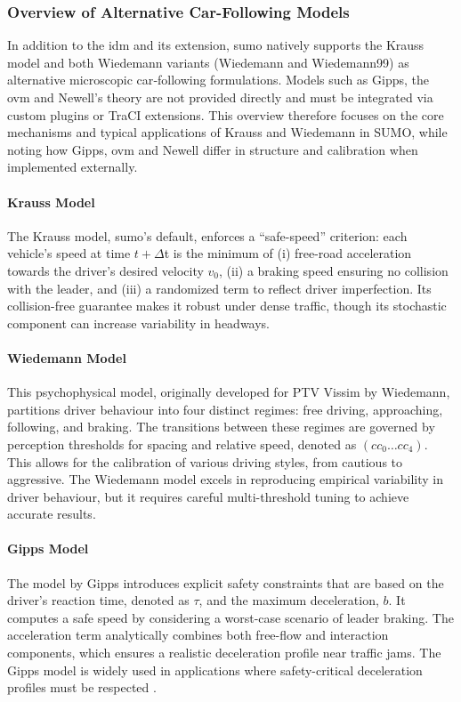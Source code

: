 \subsubsection{Overview of Alternative Car-Following Models}
\label{subsubsec:alternative_models}
In addition to the \ac{idm} and its extension, \ac{sumo} natively supports the Krauss model and both Wiedemann variants (Wiedemann and Wiedemann99) as alternative microscopic car‐following formulations. Models such as Gipps, the \acf{ovm} and Newell’s theory are not provided directly and must be integrated via custom plugins or TraCI extensions. This overview therefore focuses on the core mechanisms and typical applications of Krauss and Wiedemann in SUMO, while noting how Gipps, \ac{ovm} and Newell differ in structure and calibration when implemented externally.

\paragraph{Krauss Model}  
The Krauss model, \ac{sumo}’s default, enforces a \enquote{safe-speed} criterion: each vehicle’s speed at time $t+\Delta $t is the minimum of (i) free-road acceleration towards the driver’s desired velocity $v_0$, (ii) a braking speed ensuring no collision with the leader, and (iii) a randomized term to reflect driver imperfection. Its collision-free guarantee makes it robust under dense traffic, though its stochastic component can increase variability in headways. \cite{Krauss1997}

\paragraph{Wiedemann Model}
This psychophysical model, originally developed for PTV Vissim by Wiedemann, partitions driver behaviour into four distinct regimes: free driving, approaching, following, and braking. The transitions between these regimes are governed by perception thresholds for spacing and relative speed, denoted as $(cc_0\ldots cc_4)$. This allows for the calibration of various driving styles, from cautious to aggressive. The Wiedemann model excels in reproducing empirical variability in driver behaviour, but it requires careful multi-threshold tuning to achieve accurate results. \cite{Wiedemann1974}

\paragraph{Gipps Model}
The model by Gipps introduces explicit safety constraints that are based on the driver's reaction time, denoted as $\tau$, and the maximum deceleration, $b$. It computes a safe speed by considering a worst-case scenario of leader braking. The acceleration term analytically combines both free-flow and interaction components, which ensures a realistic deceleration profile near traffic jams. The Gipps model is widely used in applications where safety-critical deceleration profiles must be respected \cite{Gipps1981}.

